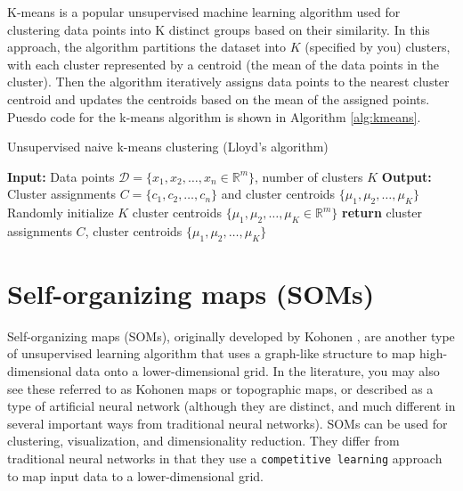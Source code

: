 \documentclass{article}[11pt]
\newcommand{\norm}[1]{\left|\left|#1\right|\right|}
\DeclareMathOperator*{\argmin}{arg\,min}
\begin{document}
K-means is a popular unsupervised machine learning algorithm used for clustering data points into K distinct groups based on their similarity.
In this approach, the algorithm partitions the dataset into $K$ (specified by you) clusters, 
with each cluster represented by a centroid (the mean of the data points in the cluster). 
Then the algorithm iteratively assigns data points to the nearest cluster centroid and updates the centroids based on the mean of the assigned points.
Puesdo code for the k-means algorithm is shown in Algorithm \ref{alg:kmeans}.

\begin{algorithm}[H]
   \begin{algorithmic}[1]
   \caption{Unsupervised naive k-means clustering (Lloyd's algorithm)}\label{alg:kmeans}
   \State \textbf{Input:} Data points $\mathcal{D} = \{x_1, x_2, \ldots, x_n\in\mathbb{R}^{m}\}$, number of clusters $K$
   \State \textbf{Output:} Cluster assignments $C = \{c_1, c_2, \ldots, c_n\}$ and cluster centroids $\{\mu_1, \mu_2, \ldots, \mu_K\}$
   \State Randomly initialize $K$ cluster centroids $\{\mu_1, \mu_2, \ldots, \mu_K\in\mathbb{R}^{m}\}$
      \State{$c_{i}\gets\underset{j}\argmin \norm{x_{i} - \mu_j}^2$}
   \EndFor 
   \State{$\hat{\mu}\gets\mu$}
   \EndFor
   \If{$\norm{\mu - \hat{\mu}} < \epsilon$}
   \EndIf
   \EndWhile
   \State \textbf{return} cluster assignments $C$, cluster centroids $\{\mu_1, \mu_2, \ldots, \mu_K\}$
   \end{algorithmic}
\end{algorithm}


\section{Self-organizing maps (SOMs)}
Self-organizing maps (SOMs), originally developed by Kohonen \citep{Kohonen:1982aa}, are another type of unsupervised learning algorithm that uses a graph-like structure to map high-dimensional data onto a lower-dimensional grid.
In the literature, you may also see these referred to as Kohonen maps or topographic maps, or described as a type of artificial neural network
(although they are distinct, and much different in several important ways from traditional neural networks).
SOMs can be used for clustering, visualization, and dimensionality reduction. 
They differ from traditional neural networks in that they use a \texttt{competitive learning} approach 
to map input data to a lower-dimensional grid.
\end{document}

